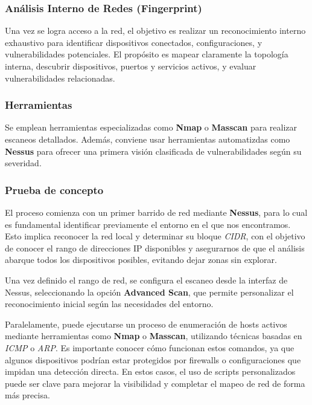 \documentclass[a4paper, 11pt]{article}
\begin{document}
\subsubsection{Análisis Interno de Redes (Fingerprint)}

Una vez se logra acceso a la red, el objetivo es realizar un reconocimiento interno exhaustivo para identificar dispositivos conectados, configuraciones, y vulnerabilidades potenciales. El propósito es mapear claramente la topología interna, descubrir dispositivos, puertos y servicios activos, y evaluar vulnerabilidades relacionadas.

\par\vspace{0.5cm}
\subsubsection*{Herramientas}
Se emplean herramientas especializadas como \textbf{Nmap} o \textbf{Masscan} para realizar escaneos detallados. Además, conviene usar 
herramientas automatizdas como \textbf{Nessus} para ofrecer una primera visión clasificada de vulnerabilidades según su severidad.

\par\vspace{0.5cm}
\subsubsection*{Prueba de concepto}
El proceso comienza con un primer barrido de red mediante \textbf{Nessus}, para lo cual es fundamental identificar previamente el entorno en el que nos encontramos. Esto implica reconocer la red local y determinar su bloque \textit{CIDR}, con el objetivo de conocer el rango de direcciones IP disponibles y asegurarnos de que el análisis abarque todos los dispositivos posibles, evitando dejar zonas sin explorar.
\par\vspace{0.5cm}

Una vez definido el rango de red, se configura el escaneo desde la interfaz de Nessus, seleccionando la opción \textbf{Advanced Scan}, que permite personalizar el reconocimiento inicial según las necesidades del entorno.
\par\vspace{0.5cm}

Paralelamente, puede ejecutarse un proceso de enumeración de hosts activos mediante herramientas como \textbf{Nmap} o \textbf{Masscan}, utilizando técnicas basadas en \textit{ICMP} o \textit{ARP}. Es importante conocer cómo funcionan estos comandos, ya que algunos dispositivos podrían estar protegidos por firewalls o configuraciones que impidan una detección directa. En estos casos, el uso de scripts personalizados puede ser clave para mejorar la visibilidad y completar el mapeo de red de forma más precisa.
\end{document}
